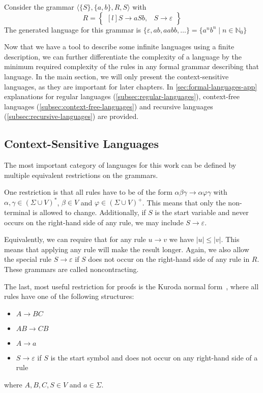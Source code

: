 \begin{exmp}
    Consider the grammar $\langle \{S\}, \{a, b\}, R, S \rangle$ with
    \[
        R = \begin{Bmatrix*}[l]
                S \to aSb,
                &S \to \varepsilon
        \end{Bmatrix*}
    \]
    The generated language for this grammar is $\{\varepsilon, ab, aabb, \dots\} = \{a^{n}b^{n} \mid n \in \mathbb{N}_0\}$
\end{exmp}

Now that we have a tool to describe some infinite languages using a finite description, we can further differentiate the complexity of a language by the minimum required complexity of the rules in any formal grammar describing that language.
In the main section, we will only present the context-sensitive languages, as they are important for later chapters.
In \cref{sec:formal-languages-app} explanations for regular languages (\cref{subsec:regular-languages}), context-free languages (\cref{subsec:context-free-languages}) and recursive languages (\cref{subsec:recursive-languages}) are provided.

\subsection{Context-Sensitive Languages}\label{subsec:context-sensitive-languages}

The most important category of languages for this work can be defined by multiple equivalent restrictions on the grammars.

One restriction is that all rules have to be of the form $\alpha\beta\gamma \to \alpha\varphi\gamma$ with $\alpha, \gamma \in (\Sigma \cup V)^{*}$, $\beta \in V$ and $\varphi \in (\Sigma \cup V)^{+}$.
This means that only the non-terminal is allowed to change.
Additionally, if $S$ is the start variable and never occurs on the right-hand side of any rule, we may include $S \to \varepsilon$.

Equivalently, we can require that for any rule $u \to v$ we have $|u| \leq |v|$.
This means that applying any rule will make the result longer.
Again, we also allow the special rule $S \to \varepsilon$ if $S$ does not occur on the right-hand side of any rule in $R$.
These grammars are called noncontracting.

The last, most useful restriction for proofs is the Kuroda normal form~\cite{Pettorossi2022}, where all rules have one of the following structures:
\begin{itemize}
    \setlength\itemsep{0.2em}
    \item $A \to BC$
    \item $AB \to CB$
    \item $A \to a$
    \item $S \to \varepsilon$ if $S$ is the start symbol and does not occur on any right-hand side of a rule
\end{itemize}
where $A, B, C, S \in V$ and $a \in \Sigma$.


